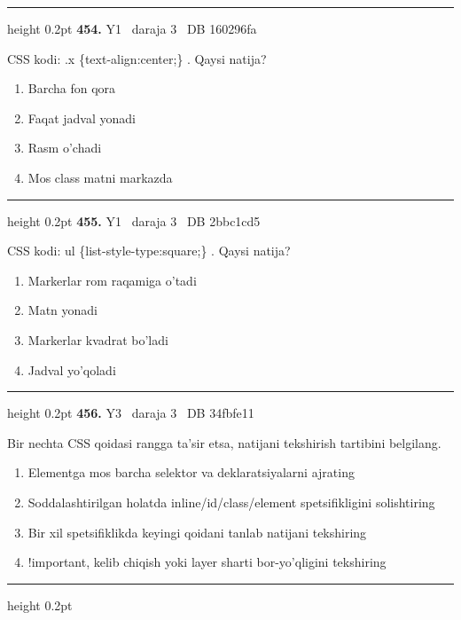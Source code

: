 \documentclass[10pt,a4paper,oneside]{article}
\begin{document}
\vspace{2mm}\hrule height 0.2pt \vspace{4mm}
\hypertarget{q454}{\textbf{\color{ink}454.}}  {\color{muted}\scriptsize Y1 \textbullet\ daraja 3 \textbullet\ DB 160296fa}
\par
CSS kodi: .x \{text-align:center;\} . Qaysi natija?
\begin{enumerate}[label=\Alph*),leftmargin=9mm]
\item Barcha fon qora
\item Faqat jadval yonadi
\item Rasm o'chadi
\item Mos class matni markazda
\end{enumerate}
\vspace{2mm}\hrule height 0.2pt \vspace{4mm}
\hypertarget{q455}{\textbf{\color{ink}455.}}  {\color{muted}\scriptsize Y1 \textbullet\ daraja 3 \textbullet\ DB 2bbc1cd5}
\par
CSS kodi: ul \{list-style-type:square;\} . Qaysi natija?
\begin{enumerate}[label=\Alph*),leftmargin=9mm]
\item Markerlar rom raqamiga o'tadi
\item Matn yonadi
\item Markerlar kvadrat bo'ladi
\item Jadval yo'qoladi
\end{enumerate}
\vspace{2mm}\hrule height 0.2pt \vspace{4mm}
\hypertarget{q456}{\textbf{\color{ink}456.}}  {\color{muted}\scriptsize Y3 \textbullet\ daraja 3 \textbullet\ DB 34fbfe11}
\par
Bir nechta CSS qoidasi rangga ta'sir etsa, natijani tekshirish tartibini belgilang.
\begin{enumerate}[label=\Alph*),leftmargin=9mm]
\item Elementga mos barcha selektor va deklaratsiyalarni ajrating
\item Soddalashtirilgan holatda inline/id/class/element spetsifikligini solishtiring
\item Bir xil spetsifiklikda keyingi qoidani tanlab natijani tekshiring
\item !important, kelib chiqish yoki layer sharti bor-yo'qligini tekshiring
\end{enumerate}
\vspace{2mm}\hrule height 0.2pt \vspace{4mm}
\end{document}
